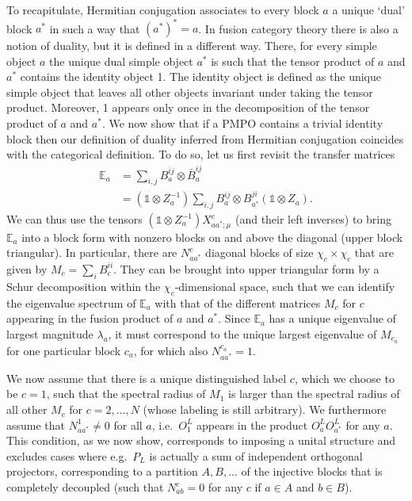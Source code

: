 \documentclass[12 pt]{article}
\begin{document}
To recapitulate, Hermitian conjugation associates to every block $a$ a unique `dual' block $a^*$ in such a way that $(a^*)^ * = a$. In fusion category theory there is also a notion of duality, but it is defined in a different way. There, for every simple object $a$ the unique dual simple object $a^*$ is such that the tensor product of $a$ and $a^ *$ contains the identity object 1. The identity object is defined as the unique simple object that leaves all other objects invariant under taking the tensor product. Moreover, 1 appears only once in the decomposition of the tensor product of $a$ and $a^*$. We now show that if a PMPO contains a trivial identity block then our definition of duality inferred from Hermitian conjugation coincides with the categorical definition. To do so, let us first revisit the transfer matrices
\begin{align*}
    \mathbb{E}_{a} & = \sum_{i,j} B^{ij}_a \otimes \bar{B}^{ij}_a                                                         \\
                   & = (\mathds{1}\otimes Z_{a}^{-1}) \sum_{i,j} B^{ij}_a \otimes B^{ji}_{a^*} (\mathds{1}\otimes Z_{a}).
\end{align*}
We can thus use the tensors $(\mathds{1}\otimes Z_{a}^{-1}) X_{aa^*;\mu}^{c}$ (and their left inverses) to bring $\mathbb{E}_{a}$ into a block form with nonzero blocks on and above the diagonal (upper block triangular). In particular, there are $N_{aa^*}^{c}$ diagonal blocks of size $\chi_c\times \chi_c$ that are given by $M_{c}=\sum_{i} B^{ii}_{c}$. They can be brought into upper triangular form by a Schur decomposition within the $\chi_c$-dimensional space, such that we can identify the eigenvalue spectrum of $\mathbb{E}_{a}$ with that of the different matrices $M_c$ for $c$ appearing in the fusion product of $a$ and $a^*$. Since $\mathbb{E}_{a}$ has a unique eigenvalue of largest magnitude $\lambda_a$, it must correspond to the unique largest eigenvalue of $M_{c_{a}}$ for one particular block $c_{a}$, for which also $N_{aa^*}^{c_a}=1$.

We now assume that there is a unique distinguished label $c$, which we choose to be $c=1$, such that the spectral radius of $M_{1}$ is larger than the spectral radius of all other $M_{c}$ for $c=2,\ldots,N$ (whose labeling is still arbitrary). We furthermore assume that $N_{aa^*}^{1}\neq 0$ for all $a$, i.e.\ $O_1^L$ appears in the product $O_a^L O_{a^*}^L$ for any $a$. This condition, as we now show, corresponds to imposing a unital structure and excludes cases where e.g.\ $P_L$ is actually a sum of independent orthogonal projectors, corresponding to a partition $A,B,...$ of the injective blocks that is completely decoupled (such that $N_{ab}^{c}=0$ for any $c$ if $a\in A$ and $b\in B$).
\end{document}
